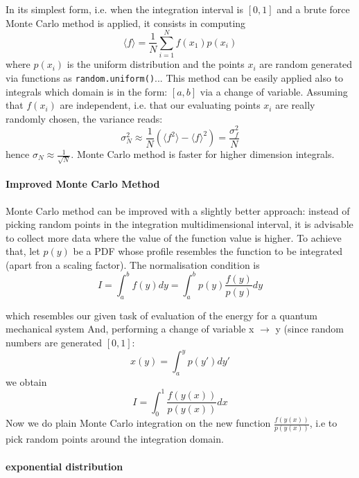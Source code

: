 \documentclass[9pt,a4paper,titlepage]{article}
\begin{document}
 In its simplest form, i.e. when the integration interval is $[0,1]$ and a brute force Monte Carlo method is applied, it consists in computing
\begin{equation}
\langle f \rangle= \frac{1}{N} \sum_{i=1}^{N}f(x_{1})p(x_{i})
\end{equation}
where $p(x_{i})$ is the uniform distribution and the points $x_{i}$ are random generated via functions as \texttt{random.uniform()}...
This method can be easily applied also to integrals which domain is in the form: $[a,b]$ via a change of variable.
Assuming that $f(x_{i})$ are independent, i.e. that our evaluating points $x_{i}$ are really randomly chosen, the variance reads:
\begin{equation}
\sigma^{2}_{N} \approx \frac{1}{N} (\langle f^{2} \rangle-\langle f \rangle^{2})= \frac{\sigma^{2}_{f}}{N}
\end{equation}
hence $\sigma_{N}\approx\frac{1}{\sqrt{N}}$.
Monte Carlo method is faster for higher dimension integrals.
\paragraph{Improved Monte Carlo Method}
Monte Carlo method can be improved with a slightly better approach: instead of picking random points in the integration multidimensional interval, it is advisable to collect more data where the value of the function value is higher. To achieve that, let $p(y)$ be a PDF whose profile resembles the function to be integrated (apart fron a scaling factor). The normalisation condition is 
\begin{equation}
I=\int_{a}^{b}f(y)dy=\int_{a}^{b}p(y)\frac{f(y)}{p(y)}dy
\end{equation}

which  resembles our given task of  evaluation of the energy for a quantum mechanical system
And, performing a change of variable x $\rightarrow$ y (since random numbers are generated $[0,1]$:
\begin{equation}
x(y)=\int_{a}^{y}p(y')dy'
\end{equation}
we obtain 
\begin{equation}
I=\int_{0}^{1}\frac{f(y(x))}{p(y(x))}dx
\end{equation}
Now we do plain Monte Carlo integration on the new function $\frac{f(y(x))}{p(y(x))}$,  i.e to pick random points around the integration domain. 
\paragraph{exponential distribution}
\end{document}
